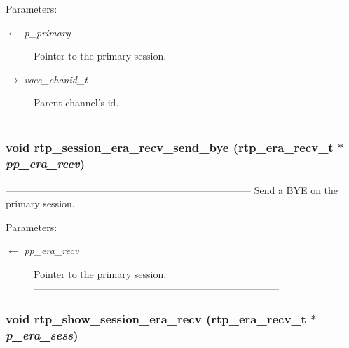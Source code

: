 \begin{Desc}
\item[Parameters:]
\begin{description}
\item[\mbox{$\leftarrow$} {\em p\_\-primary}]Pointer to the primary session. \item[\mbox{$\rightarrow$} {\em vqec\_\-chanid\_\-t}]Parent channel's id. --------------------------------------------------------------------------- \end{description}
\end{Desc}
\subsubsection{\setlength{\rightskip}{0pt plus 5cm}void rtp\_\-session\_\-era\_\-recv\_\-send\_\-bye (\bf{rtp\_\-era\_\-recv\_\-t} $\ast$ {\em pp\_\-era\_\-recv})}\label{rtp__era__recv_8h_677955d12269304e7c2e0079f025e1b9}


--------------------------------------------------------------------------- Send a BYE on the primary session.

\begin{Desc}
\item[Parameters:]
\begin{description}
\item[\mbox{$\leftarrow$} {\em pp\_\-era\_\-recv}]Pointer to the primary session. --------------------------------------------------------------------------- \end{description}
\end{Desc}
\subsubsection{\setlength{\rightskip}{0pt plus 5cm}void rtp\_\-show\_\-session\_\-era\_\-recv (\bf{rtp\_\-era\_\-recv\_\-t} $\ast$ {\em p\_\-era\_\-sess})}\label{rtp__era__recv_8h_306a6d64c5e6a6c633cdc813030552e2}


